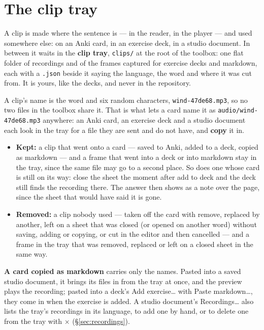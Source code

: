\documentclass[11pt,oneside]{report}
\newcommand{\file}[1]{\texttt{#1}}
\newcommand{\menu}[1]{\textsf{#1}}
\begin{document}
\section{The clip tray}
\label{sec:cliptray}

A clip is made where the sentence is --- in the reader, in the player ---
and used somewhere else: on an Anki card, in an exercise deck, in a studio
document. In between it waits in the \textbf{clip tray}, \file{clips/} at
the root of the toolbox: one flat folder of recordings and of the frames
captured for exercise decks and markdown, each with a \file{.json} beside it
saying the language, the word and where it was cut from. It is yours, like
the decks, and never in the repository.

A clip's name is the word and six random characters,
\file{wind-47de68.mp3}, so no two files in the toolbox share it. That is
what lets a card name it as \texttt{audio/wind-47de68.mp3} anywhere: an
Anki card, an exercise deck and a studio document each look in the tray for
a file they are sent and do not have, and \textbf{copy} it in.

\begin{itemize}
\item \textbf{Kept:} a clip that went onto a card --- saved to Anki, added
  to a deck, copied as markdown --- and a frame that went into a deck or
  into markdown stay in the tray, since the same file may go to a second
  place. So does one whose card is still on its way: close the sheet the
  moment after \menu{add to deck} and the deck still finds the recording
  there. The answer then shows as a note over the page, since the sheet
  that would have said it is gone.
\item \textbf{Removed:} a clip nobody used --- taken off the card with
  \menu{remove}, replaced by another, left on a sheet that was closed (or
  opened on another word) without saving, adding or copying, or cut in the
  editor and then cancelled --- and a frame in the tray that was removed,
  replaced or left on a closed sheet in the same way.
\end{itemize}

\textbf{A card copied as markdown} carries only the names. Pasted into a
saved studio document, it brings its files in from the tray at once, and
the preview plays the recording; pasted into a deck's \menu{Add
exercise\ldots} with \menu{Paste markdown\ldots}, they come in when the
exercise is added. A studio document's \menu{Recordings\ldots} also lists
the tray's recordings in its language, to add one by hand, or to delete one
from the tray with \menu{$\times$} (\S\ref{sec:recordings}).
\end{document}

